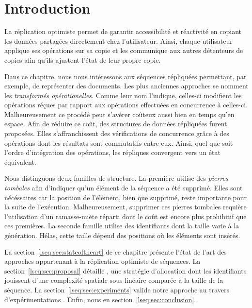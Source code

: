 
\section{Introduction}

La réplication optimiste permet de garantir accessibilité et réactivité en
copiant les données partagées directement chez l'utilisateur. Ainsi, chaque
utilisateur applique ses opérations sur sa copie et les communique aux autres
détenteurs de copies afin qu'ils ajustent l'état de leur propre copie.

Dans ce chapitre, nous nous intéressons aux séquences répliquées  permettant, par exemple, de représenter des
documents. Les plus anciennes approches se nomment les \emph{transformés
  opérationelles}. Comme leur nom l'indique, celles-ci modifient les opérations
réçues par rapport aux opérations effectuées en concurrence à
celles-ci. Malheureusement ce procédé peut s'avérer coûteux aussi bien en temps
qu'en espace.  Afin de réduire ce coût, des structures de données répliquées
furent proposées. Elles s'affranchissent des vérifications de concurrence grâce
à des opérations dont les résultats sont commutatifs entre eux. Ainsi, quel que
soit l'ordre d'intégration des opérations, les répliques convergent vers un
état équivalent.

Nous distinguons deux familles de structure. La première utilise des
\emph{pierres tombales} afin d'indiquer qu'un élément de la séquence a été
supprimé. Elles sont nécéssaires car la position de l'élément, bien que
supprimé, reste importante pour la suite de l'exécution. Malheureusement,
supprimer ces pierres tombales requière l'utilisation d'un ramasse-miète réparti
dont le coût est encore plus prohibitif que ces premières. La seconde famille
utilise des identifiants dont la taille varie à la génération. Hélas, cette
taille dépend des positions où les éléments sont insérés. 

La section~\ref{lseq:sec:stateoftheart} de ce chapitre présente l'état de l'art
des approches appartenant à la réplication optimiste de séquences. La
section~\ref{lseq:sec:proposal} détaille \LSEQ, une stratégie d'allocation dont
les identifiants jouissent d'une complexité spatiale sous-linéaire comparée à la
taille de la séquence. La section~\ref{lseq:sec:experiments} valide notre
approche au travers d'expérimentations . Enfin, nous
 en section~\ref{lseq:sec:conclusion}.

